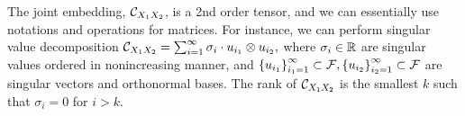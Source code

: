 \documentclass{article}
\newcommand{\hmu}{\widehat{\mu}}
\begin{document}
The joint embedding, $\mathcal{C}_{X_1 X_2}$, is a 2nd order tensor, and we can essentially use notations and operations for matrices. For instance, we can perform singular value decomposition
$
    \mathcal{C}_{X_1X_2} = \sum_{i=1}^{\infty} \sigma_i \cdot u_{i_1} \otimes u_{i_2},
$
where $\sigma_i \in \mathbb{R}$ are singular values ordered in nonincreasing manner, and $\left\{u_{i_1}\right\}_{i_1=1}^{\infty} \subset \mathcal{F}, \left\{u_{i_2}\right\}_{i_2=1}^{\infty} \subset \mathcal{F}$ are singular vectors and orthonormal bases. The rank of $\mathcal{C}_{X_1X_2}$ is the smallest $k$ such that $\sigma_i = 0$ for $i > k$.

%
%
%
\end{document}

